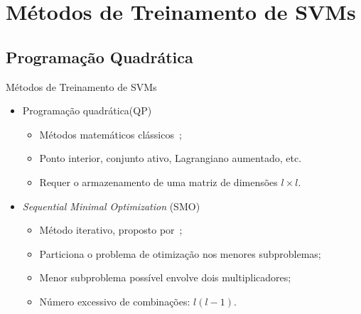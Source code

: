\documentclass{beamer}
\begin{document}
\section{Métodos de Treinamento de SVMs}

\subsection{Programação Quadrática}

\begin{frame}{Métodos de Treinamento de SVMs}
  
  \begin{itemize}
    \item Programação quadrática(QP)
    \begin{itemize}
      \item Métodos matemáticos clássicos~\cite{nocedal2006};
      \item Ponto interior, conjunto ativo, Lagrangiano aumentado, etc.
      \item Requer o armazenamento de uma matriz de dimensões $l \times l$.
    \end{itemize}
    \vspace{0.5em}
    \item \textit{Sequential Minimal Optimization} (SMO)
    \begin{itemize}
      \item Método iterativo, proposto por~;
      \item Particiona o problema de otimização nos menores subproblemas;
      \item Menor subproblema possível envolve dois multiplicadores;
      \item Número excessivo de combinações: $l(l-1)$.
    \end{itemize}
    
  \end{itemize}
\end{frame}
\end{document}
